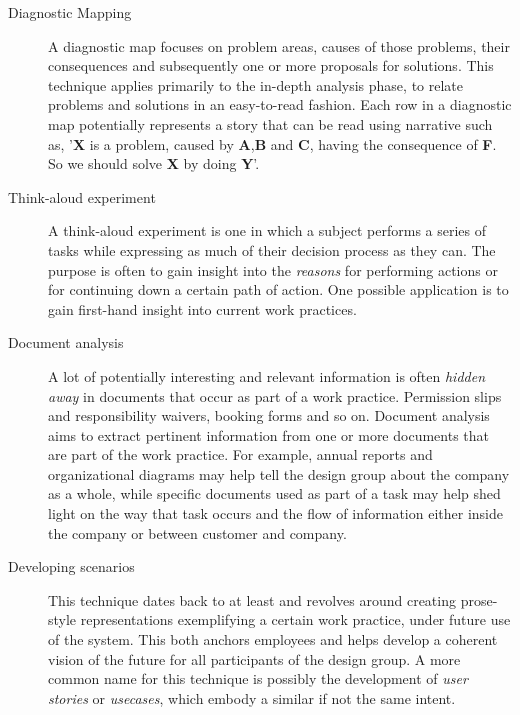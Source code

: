 \begin{description}
    \item [Diagnostic Mapping] A diagnostic map focuses on problem areas, causes
        of those problems, their consequences and subsequently one or more
        proposals for solutions. This technique applies primarily to the
        in-depth analysis phase, to relate problems and solutions in an
        easy-to-read fashion. Each row in a diagnostic map potentially
        represents a story that can be read using narrative such as, '\textbf{X}
        is a problem, caused by \textbf{A},\textbf{B} and \textbf{C}, having the
        consequence of \textbf{F}. So we should solve \textbf{X} by doing
        \textbf{Y}'. 

    \item [Think-aloud experiment] A think-aloud experiment is one in which a
        subject performs a series of tasks while expressing as much of their
        decision process as they can. The purpose is often to gain insight into
        the \textit{reasons} for performing actions or for continuing down a
        certain path of action. One possible application is to gain first-hand
        insight into current work practices.

    \item [Document analysis] A lot of potentially interesting and relevant
        information is often \textit{hidden away} in documents that occur as
        part of a work practice. Permission slips and responsibility waivers,
        booking forms and so on. Document analysis aims to extract pertinent
        information from one or more documents that are part of the work
        practice. For example, annual reports and organizational diagrams may
        help tell the design group about the company as a whole, while specific
        documents used as part of a task may help shed light on the way that
        task occurs and the flow of information either inside the company or
        between customer and company.

    \item [Developing scenarios] This technique dates back to at least
        \cite{clausen1993narratives} and revolves around creating prose-style
        representations exemplifying a certain work practice, under future use
        of the system. This both anchors employees and helps develop a coherent
        vision of the future for all participants of the design group. A more
        common name for this technique is possibly the development of
        \textit{user stories} or \textit{usecases}, which embody a similar if
        not the same intent.


\end{description}
